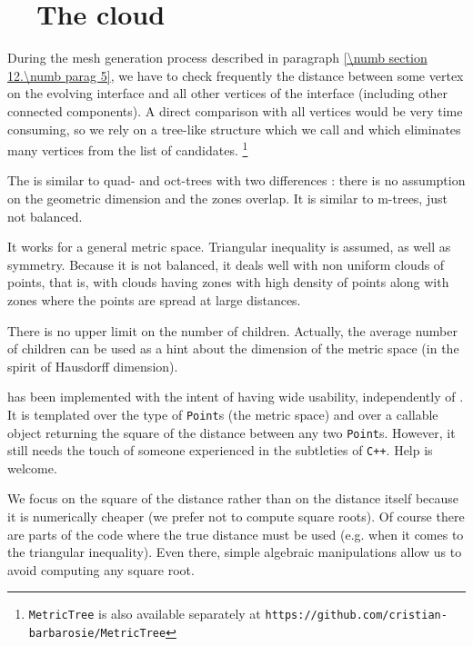\section{~~The cloud}\label{\numb section 12.\numb parag 10}

During the mesh generation process described in paragraph \ref{\numb section 12.\numb parag 5},
we have to check frequently the distance between
some vertex on the evolving interface and all other vertices of the interface
(including other connected components).
A direct comparison with all vertices would be very time consuming, so we rely on a tree-like
structure which we call {\small\tt{}} and which eliminates many vertices from the list
of candidates.%
\footnote {{\footnotesize\tt MetricTree} is also available separately at
{\footnotesize\tt https://github.com/cristian-barbarosie/MetricTree}}

The {\small\tt{}} is similar to quad- and oct-trees with two differences :
there is no assumption on the geometric dimension and the zones overlap.
It is similar to m-trees, just not balanced.

It works for a general metric space.
Triangular inequality is assumed, as well as symmetry.
Because it is not balanced, it deals well with non uniform clouds of points, that is,
with clouds having zones with
high density of points along with zones where the points are spread at large distances.

There is no upper limit on the number of children.
Actually, the average number of children can be used as a hint about the dimension of the
metric space (in the spirit of Hausdorff dimension).

{\small\tt {}} has been implemented with the intent of having wide usability,
independently of \maniFEM.
It is templated over the type of {\small\tt Point}s (the metric space) and over a callable
object returning the square of the distance between any two {\small\tt Point}s.
However, it still needs the touch of someone experienced in the subtleties of {\tt C++}.
Help is welcome.

We focus on the square of the distance rather than on the distance itself because it
is numerically cheaper (we prefer not to compute square roots).
Of course there are parts of the code where the true distance must be used
(e.g. when it comes to the triangular inequality).
Even there, simple algebraic manipulations allow us to avoid computing any square root.

